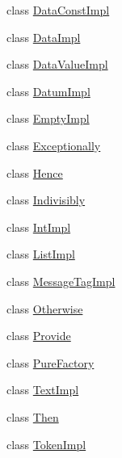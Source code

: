 \begin{CompactItemize}
\item 
class \hyperlink{classDataConstImpl}{Data\-Const\-Impl}
\item 
class \hyperlink{classDataImpl}{Data\-Impl}
\item 
class \hyperlink{classDataValueImpl}{Data\-Value\-Impl}
\item 
class \hyperlink{classDatumImpl}{Datum\-Impl}
\item 
class \hyperlink{classEmptyImpl}{Empty\-Impl}
\item 
class \hyperlink{classExceptionally}{Exceptionally}
\item 
class \hyperlink{classHence}{Hence}
\item 
class \hyperlink{classIndivisibly}{Indivisibly}
\item 
class \hyperlink{classIntImpl}{Int\-Impl}
\item 
class \hyperlink{classListImpl}{List\-Impl}
\item 
class \hyperlink{classMessageTagImpl}{Message\-Tag\-Impl}
\item 
class \hyperlink{classOtherwise}{Otherwise}
\item 
class \hyperlink{classProvide}{Provide}
\item 
class \hyperlink{classPureFactory}{Pure\-Factory}
\item 
class \hyperlink{classTextImpl}{Text\-Impl}
\item 
class \hyperlink{classThen}{Then}
\item 
class \hyperlink{classTokenImpl}{Token\-Impl}
\end{CompactItemize}
